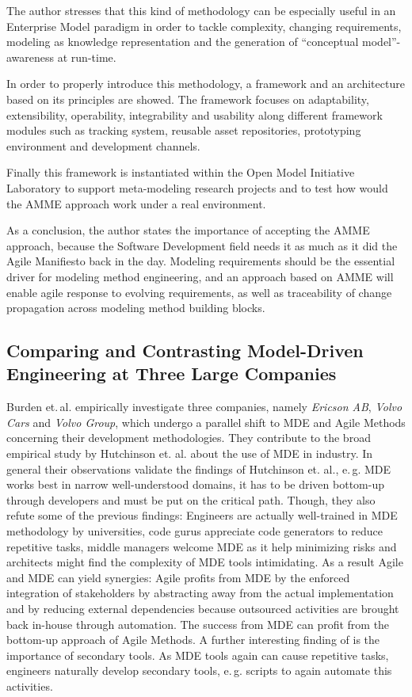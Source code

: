\documentclass[10pt, a4paper, twocolumn]{article}
\begin{document}
The author stresses that this kind of methodology can be especially useful in an Enterprise Model paradigm in order to tackle complexity, changing requirements, modeling as knowledge representation and the generation of “conceptual model”-awareness at run-time.

In order to properly introduce this methodology, a framework and an architecture based on its principles are showed. The framework focuses on adaptability, extensibility, operability, integrability and usability along different framework modules such as tracking system, reusable asset repositories, prototyping environment and development channels. 

Finally this framework is instantiated within the Open Model Initiative Laboratory to support meta-modeling research projects and to test how would the AMME approach work under a real environment. 

As a conclusion, the author states the importance of accepting the AMME approach, because the Software Development field needs it as much as it did the Agile Manifiesto back in the day. Modeling
requirements should be the essential driver for modeling method engineering, and an approach based on AMME will enable agile response to evolving requirements, as well as traceability of change propagation across modeling method building blocks.

\subsection{Comparing and Contrasting Model-Driven Engineering at Three Large Companies}

Burden et.\,al. \cite{10} empirically investigate three companies, namely \emph{Ericson AB}, \emph{Volvo Cars} and \emph{Volvo Group}, which undergo a parallel shift to MDE and Agile Methods concerning their development methodologies.
They contribute to the broad empirical study by Hutchinson et. al. \cite{secondaryHutchinsonEmpirical} about the use of MDE in industry.
In general their observations validate the findings of Hutchinson et. al., e.\,g. MDE works best in narrow well-understood domains, it has to be driven bottom-up through developers and must be put on the critical path.
Though, they also refute some of the previous findings: 
Engineers are actually well-trained in MDE methodology by universities, code gurus appreciate code generators to reduce repetitive tasks, middle managers welcome MDE as it help minimizing risks and architects might find the complexity of MDE tools intimidating.
As a result Agile and MDE can yield synergies:
Agile profits from MDE by the enforced integration of stakeholders by abstracting away from the actual implementation and by reducing external dependencies because outsourced activities are brought back in-house through automation.
The success from MDE can profit from the bottom-up approach of Agile Methods.
A further interesting finding of \cite{10} is the importance of secondary tools. 
As MDE tools again can cause repetitive tasks, engineers naturally develop secondary tools, e.\,g. scripts to again automate this activities.
\end{document}
